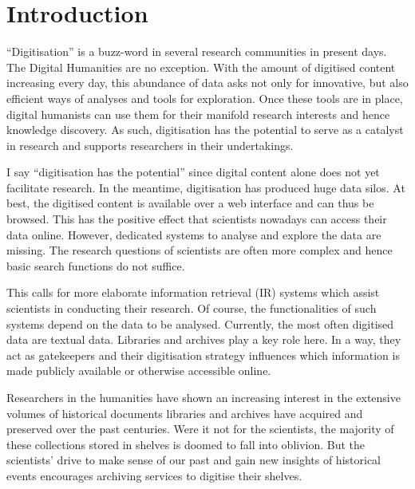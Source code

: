 

\section{Introduction}
``Digitisation'' is a buzz-word in several research communities in present days. The Digital Humanities are no exception. With the amount of digitised content increasing every day, this abundance of data asks not only for innovative, but also efficient ways of analyses and tools for exploration. Once these tools are in place, digital humanists can use them for their manifold research interests and hence knowledge discovery. As such, digitisation has the potential to serve as a catalyst in research and supports researchers in their undertakings.

I say ``digitisation has the potential'' since digital content alone does not yet facilitate research. In the meantime, digitisation has produced huge data silos. At best, the digitised content is available over a web interface and can thus be browsed. This has the positive effect that scientists nowadays can access their data online. However, dedicated systems to analyse and explore the data are missing. The research questions of scientists are often more complex and hence basic search functions do not suffice.

This calls for more elaborate information retrieval (IR) systems which assist scientists in conducting their research. Of course, the functionalities of such systems depend on the data to be analysed. Currently, the most often digitised data are textual data. Libraries and archives play a key role here. In a way, they act as gatekeepers and their digitisation strategy influences which information is made publicly available or otherwise accessible online.

Researchers in the humanities have shown an increasing interest in the extensive volumes of historical documents libraries and archives have acquired and preserved over the past centuries. Were it not for the scientists, the majority of these collections stored in shelves is doomed to fall into oblivion. But the scientists' drive to make sense of our past and gain new insights of historical events encourages archiving services to digitise their shelves.

